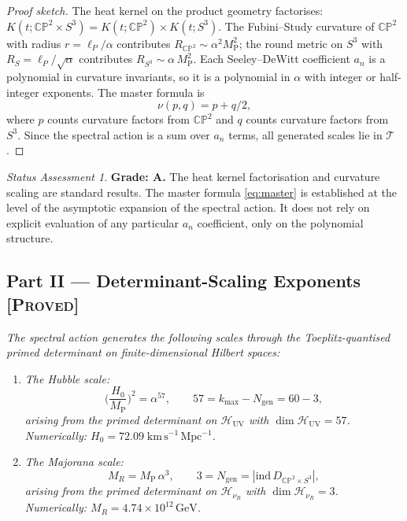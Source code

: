 \documentclass[11pt]{article}
\theoremstyle{definition}
\theoremstyle{remark}
\newtheorem*{status}{Status Assessment}
\newcommand{\CP}{\mathbb{CP}}
\newcommand{\MP}{M_{\mathrm{P}}}
\newcommand{\GeV}{\,\mathrm{GeV}}
\begin{document}
\begin{proof}[Proof sketch]
The heat kernel on the product geometry factorises:
$K(t;\CP^2 \times S^3) = K(t;\CP^2) \times K(t;S^3)$.  The
Fubini--Study curvature of $\CP^2$ with radius $r = \ell_P/\alpha$
contributes $R_{\CP^2} \sim \alpha^2 \MP^2$; the round metric on $S^3$
with $R_S = \ell_P/\sqrt{\alpha}$ contributes $R_{S^3} \sim \alpha\,\MP^2$.
Each Seeley--DeWitt coefficient $a_n$ is a polynomial in curvature
invariants, so it is a polynomial in $\alpha$ with integer or
half-integer exponents.  The master formula is
\begin{equation}\label{eq:master}
  \nu(p, q) = p + q/2,
\end{equation}
where $p$ counts curvature factors from $\CP^2$ and $q$ counts
curvature factors from $S^3$.  Since the spectral action is a sum
over $a_n$ terms, all generated scales lie in $\mathcal{T}$.
\end{proof}

\begin{status}
\textbf{Grade: A.}  The heat kernel factorisation and curvature scaling
are standard results.  The master formula \eqref{eq:master} is
established at the level of the asymptotic expansion of the spectral
action.  It does not rely on explicit evaluation of any particular
$a_n$ coefficient, only on the polynomial structure.
\end{status}


\subsection*{Part II --- Determinant-Scaling Exponents%
\hfill\normalfont\textsc{[Proved]}}

\textit{The spectral action generates the following scales through the
Toeplitz-quantised primed determinant on finite-dimensional Hilbert
spaces:}
\begin{enumerate}
\item[\textup{(a)}] \textit{The Hubble scale:}
\begin{equation}\label{eq:hubble}
  \biggl(\frac{H_0}{\MP}\biggr)^{\!2} = \alpha^{57},
  \qquad 57 = k_{\max} - N_{\mathrm{gen}} = 60 - 3,
\end{equation}
\textit{arising from the primed determinant on $\mathcal{H}_{\mathrm{UV}}$
with $\dim \mathcal{H}_{\mathrm{UV}} = 57$.  Numerically:
$H_0 = 72.09\;\mathrm{km\,s^{-1}\,Mpc^{-1}}$.}

\item[\textup{(b)}] \textit{The Majorana scale:}
\begin{equation}\label{eq:majorana}
  M_R = \MP\,\alpha^{3},
  \qquad 3 = N_{\mathrm{gen}} = |\mathrm{ind}\,D_{\CP^2 \times S^3}|,
\end{equation}
\textit{arising from the primed determinant on
$\mathcal{H}_{\nu_R}$ with $\dim \mathcal{H}_{\nu_R} = 3$.
Numerically: $M_R = 4.74 \times 10^{12}\GeV$.}
\end{enumerate}
\end{document}
